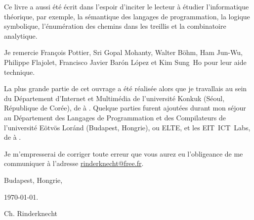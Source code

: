 Ce livre a aussi été écrit dans l'espoir d'inciter le lecteur à
étudier l'informatique théorique, par exemple, la sémantique des
langages de programmation, la logique symbolique, l'énumération des
chemins dans les treillis et la combinatoire analytique.

Je remercie Fran\c{c}ois Pottier, Sri Gopal Mohanty, Walter B\"ohm,
Ham Jun-Wu, Philippe Flajolet, Francisco Javier Bar\'on L\'opez et\!
Kim Sung~Ho pour leur aide technique.

La plus grande partie de cet ouvrage a été réalisée alors que je
travallais au sein du Département d'Internet et Multimédia de
l'université Konkuk (Séoul, République de Corée), de
 à . Quelque parties furent
ajoutées durant mon séjour au Département des Langages de
Programmation et des Compilateurs de l'université E\"otv\"os Lor\'and
(Budapest, Hongrie), ou ELTE, et les EIT~ICT~Labs, de
 à .

Je m'empresserai de corriger toute erreur que vous aurez eu
l'obligeance de me communiquer à l'adresse \url{rinderknecht@free.fr}.

\bigskip

\hfill{}Budapest, Hongrie,

\hfill\today.

\hfill{}Ch. Rinderknecht
